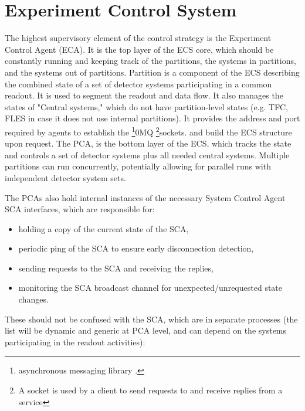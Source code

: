 \section{Experiment Control System}\label{sssAgents}

The highest supervisory element of the control strategy is the Experiment Control Agent (\gls{ECA}). It is the top layer of the \gls{ECS} core, which should be constantly running and keeping track of the  partitions, the systems in partitions, and the systems out of partitions. Partition is a component of the \gls{ECS} describing the combined state of a set of detector systems participating in a common readout. It is used to segment the readout and data flow. It also manages the states of "Central systems," which do not have partition-level states (e.g. \gls{TFC}, \gls{FLES} in case it does not use internal partitions).  It provides the address and port required by agents to establish the \footnote{asynchronous messaging library \cite{zeromq}.}{0MQ} \footnote{A socket is used by a client to send requests to and receive replies from a service}{sockets.} and build the \gls{ECS} structure upon request. The \gls{PCA}, is the bottom layer of the \gls{ECS}, which tracks the state and controls a set of detector systems plus all needed central systems. Multiple partitions can run concurrently, potentially allowing for parallel runs with independent detector system sets. 

The \glspl{PCA} also hold internal instances of the necessary System Control Agent \gls{SCA} interfaces, which are responsible for:
\begin{itemize}
 \item holding a copy of the current state of the \gls{SCA},
 \item periodic ping of the \gls{SCA} to ensure early disconnection detection,
 \item sending requests to the \gls{SCA} and receiving the replies,
 \item monitoring the \gls{SCA} broadcast channel for unexpected/unrequested state changes.
\end{itemize}

These should not be confused with the \gls{SCA}, which are in separate processes (the list will be dynamic and generic at \gls{PCA} level, and can depend on the systems participating in the readout activities):

